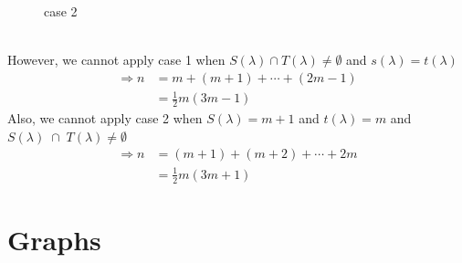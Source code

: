 \documentclass{article}
\theoremstyle{definition}
\newenvironment{pf*}{\pushQED{\qed}\pf}{\popQED\endpf}
\begin{document}
\begin{pf*}
\begin{figure}[!h]
        \caption{case 2}
        \label{diag2} 
    \end{figure}
    \\
    However, we cannot apply case 1 when $S(\lambda) \cap T(\lambda) \ne \emptyset$
    and $s(\lambda) = t(\lambda)$ 
    \begin{align*}
        \Rightarrow n &= m + (m+ 1) + \cdots + (2m-1) \\
        &= \frac{1}{2}m (3m-1)
    \end{align*}
    Also, we cannot apply case 2 when $S(\lambda) = m + 1$ and $t(\lambda) = m$ 
    and $S(\lambda) \;\cap\; T(\lambda) \ne \emptyset$
    \begin{align*}
        \Rightarrow n &= (m+1) + (m+2) + \cdots + 2m \\ 
        &= \frac{1}{2}m (3m+1)
    \end{align*}
\end{pf*}
\section{Graphs}
\end{document}
